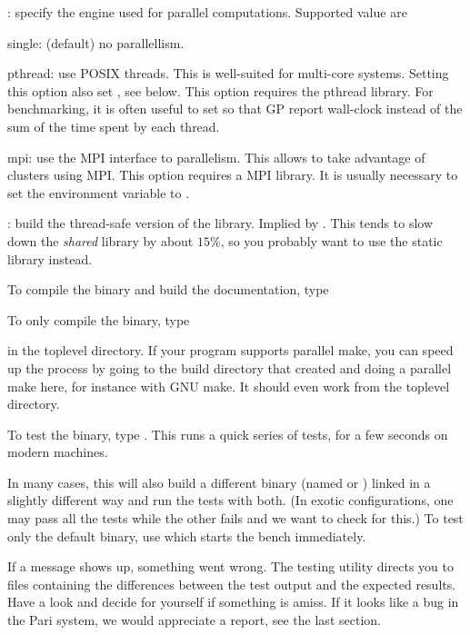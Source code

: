 : specify the engine used for parallel computations.
Supported value are

\item single: (default) no parallellism.

\item pthread: use POSIX threads. This is well-suited for multi-core systems.
Setting this option also set , see below. This option
requires the pthread library.
For benchmarking, it is often useful to set  so that GP
report wall-clock instead of the sum of the time spent by each thread.

\item mpi: use the MPI interface to parallelism.  This allows to take
advantage of clusters using MPI. This option requires a MPI library.
It is usually necessary to set the environment variable  to
.

: build the thread-safe version of the library. Implied by
. This tends to slow down the \emph{shared} library
 by about $15\%$, so you probably want to use the static
library  instead.

 To compile the  binary and build the
documentation, type


\noindent To only compile the  binary, type


\noindent in the toplevel directory. If your  program supports
parallel make, you can speed up the process by going to the build
directory that  created and doing a parallel make here, for
instance  with GNU make. It should even work from the toplevel
directory.


To test the binary, type . This runs a quick series of
tests, for a few seconds on modern machines.

In many cases, this will also build a different binary (named  or
) linked in a slightly different way and run the tests with both.
(In exotic configurations, one may pass all the tests while the other fails
and we want to check for this.) To test only the default binary, use
 which starts the bench immediately.

If a \kbd{[BUG]} message shows up, something went wrong. The testing utility
directs you to files containing the differences between the test output and
the expected results. Have a look and decide for yourself if something is
amiss. If it looks like a bug in the Pari system, we would appreciate a
report, see the last section.

